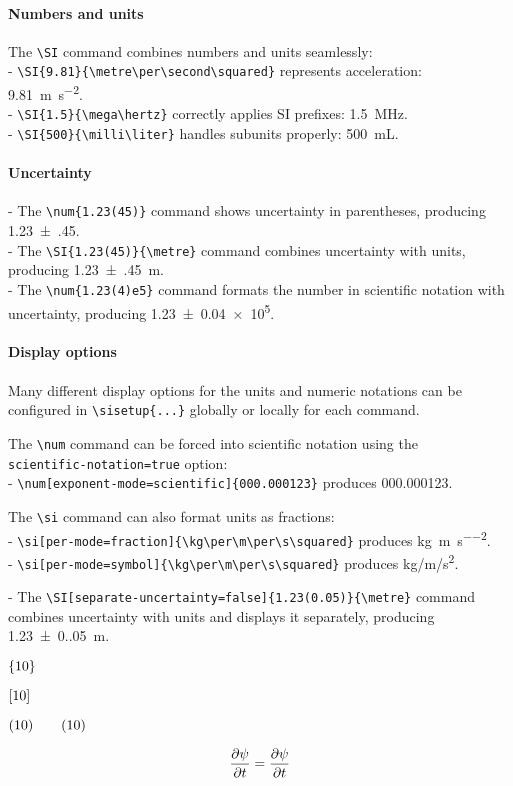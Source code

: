 	\paragraph*{Numbers and units}
	The \verb|\SI| command combines numbers and units seamlessly:  \\
	- \verb|\SI{9.81}{\metre\per\second\squared}| represents acceleration:\\ \SI{9.81}{\metre\per\second\squared}.  \\
	- \verb|\SI{1.5}{\mega\hertz}| correctly applies SI prefixes: \SI{1.5}{\mega\hertz}.  \\
	- \verb|\SI{500}{\milli\liter}| handles subunits properly: \SI{500}{\milli\liter}.

	\paragraph*{Uncertainty}
	- The \verb|\num{1.23(45)}| command shows uncertainty in parentheses, producing \num{1.23(45)}. \\
	- The \verb|\SI{1.23(45)}{\metre}| command combines uncertainty with units, producing \SI{1.23(45)}{\metre}.  \\
	- The \verb|\num{1.23(4)e5}| command formats the number in scientific notation with uncertainty, producing \num{1.23(4)e5}.

	\paragraph*{Display options}
	Many different display options for the units and numeric notations can be configured in \verb|\sisetup{...}| globally or locally for each command.

	The \verb|\num| command can be forced into scientific notation using the \\
	\verb|scientific-notation=true| option:\\
	- \verb|\num[exponent-mode=scientific]{000.000123}| produces \num[exponent-mode=scientific]{000.000123}.

	The \verb|\si| command can also format units as fractions:  \\
	- \verb|\si[per-mode=fraction]{\kg\per\m\per\s\squared}| produces \si[per-mode=fraction]{\kg\per\m\per\s\squared}.\\
	- \verb|\si[per-mode=symbol]{\kg\per\m\per\s\squared}| produces \si[per-mode=symbol]{\kg\per\m\per\s\squared}.

	- The \verb|\SI[separate-uncertainty=false]{1.23(0.05)}{\metre}| command combines uncertainty with units and displays it separately, producing \SI[separate-uncertainty=false]{1.23(0.05)}{\metre}.







$\set{10}$

$\set[10]$

$\set(10) \qquad \qty(10)$


\begin{equation}
	\pdv{\psi}{t}
	=
	\frac{\partial \psi}{\partial t}
\end{equation}

